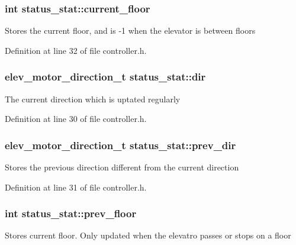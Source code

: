 \subsubsection[{\texorpdfstring{current\+\_\+floor}{current_floor}}]{\setlength{\rightskip}{0pt plus 5cm}int status\+\_\+stat\+::current\+\_\+floor}\hypertarget{structstatus__stat_afb8f4c42e97ba9ede62ba17a2f157757}{}\label{structstatus__stat_afb8f4c42e97ba9ede62ba17a2f157757}
Stores the current floor, and is -\/1 when the elevator is between floors 

Definition at line 32 of file controller.\+h.

\subsubsection[{\texorpdfstring{dir}{dir}}]{\setlength{\rightskip}{0pt plus 5cm}elev\+\_\+motor\+\_\+direction\+\_\+t status\+\_\+stat\+::dir}\hypertarget{structstatus__stat_a86473b5ad6efc13580fd36cd74490f8f}{}\label{structstatus__stat_a86473b5ad6efc13580fd36cd74490f8f}
The current direction which is uptated regularly 

Definition at line 30 of file controller.\+h.

\subsubsection[{\texorpdfstring{prev\+\_\+dir}{prev_dir}}]{\setlength{\rightskip}{0pt plus 5cm}elev\+\_\+motor\+\_\+direction\+\_\+t status\+\_\+stat\+::prev\+\_\+dir}\hypertarget{structstatus__stat_a57dbf007f4cf7b8d0b2872a99f5e6f62}{}\label{structstatus__stat_a57dbf007f4cf7b8d0b2872a99f5e6f62}
Stores the previous direction different from the current direction 

Definition at line 31 of file controller.\+h.

\subsubsection[{\texorpdfstring{prev\+\_\+floor}{prev_floor}}]{\setlength{\rightskip}{0pt plus 5cm}int status\+\_\+stat\+::prev\+\_\+floor}\hypertarget{structstatus__stat_a4ccf00bc4cb3475a93c3bf5eb2a9a819}{}\label{structstatus__stat_a4ccf00bc4cb3475a93c3bf5eb2a9a819}
Stores current floor. Only updated when the elevatro passes or stops on a floor 

